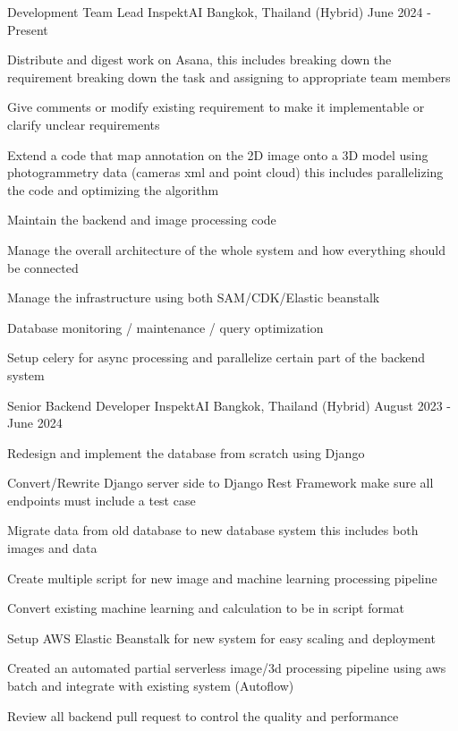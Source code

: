 

\begin{cventries}
  \cventry
  {Development Team Lead}
  {InspektAI}
  {Bangkok, Thailand (Hybrid)}
  {June 2024 - Present}
  {
    \begin{cvitems}
      \item {Distribute and digest work on Asana, this includes breaking down the requirement breaking down the task and assigning to appropriate team members}
      \item {Give comments or modify existing requirement to make it implementable or clarify unclear requirements}
      \item {Extend a code that map annotation on the 2D image onto a 3D model using photogrammetry data (cameras xml and point cloud) this includes parallelizing the code and optimizing the algorithm}
      \item {Maintain the backend and image processing code}
      \item {Manage the overall architecture of the whole system and how everything should be connected}
      \item {Manage the infrastructure using both SAM/CDK/Elastic beanstalk }
      \item {Database monitoring / maintenance / query optimization}
      \item {Setup celery for async processing and parallelize certain part of the backend system}
    \end{cvitems}
  }

  \cventry
  {Senior Backend Developer}
  {InspektAI}
  {Bangkok, Thailand (Hybrid)}
  {August 2023 - June 2024}
  {
    \begin{cvitems}
      \item {Redesign and implement the database from scratch using Django}
      \item {Convert/Rewrite Django server side to Django Rest Framework make sure all endpoints must include a test case}
      \item {Migrate data from old database to new database system this includes both images and data}
      \item {Create multiple script for new image and machine learning processing pipeline}
      \item {Convert existing machine learning and calculation to be in script format}
      \item {Setup AWS Elastic Beanstalk for new system for easy scaling and deployment}
      \item {Created an automated partial serverless image/3d processing pipeline using aws batch and integrate with existing system (Autoflow)}
      \item {Review all backend pull request to control the quality and performance}
    \end{cvitems}
  }


\end{cventries}
